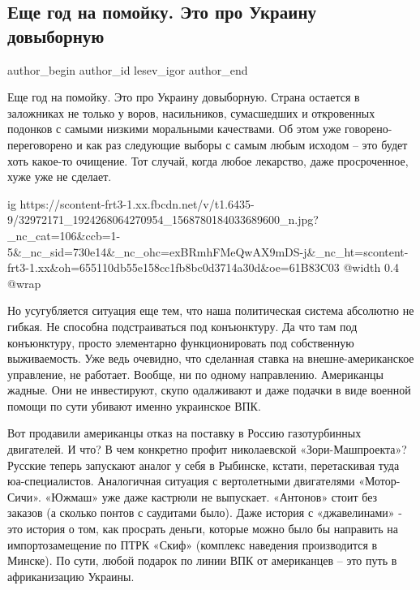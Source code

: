  
 
 
 
 
 
\subsection{Еще год на помойку. Это про Украину довыборную}
\label{sec:20_05_2018.fb.lesev_igor.1.pomojka_god_ukraina}
 
\ifcmt
 author_begin
   author_id lesev_igor
 author_end
\fi

Еще год на помойку. Это про Украину довыборную. Страна остается в заложниках не
только у воров, насильников, сумасшедших и откровенных подонков с самыми
низкими моральными качествами. Об этом уже говорено-переговорено и как раз
следующие выборы с самым любым исходом – это будет хоть какое-то очищение. Тот
случай, когда любое лекарство, даже просроченное, хуже уже не сделает.

\ifcmt
  ig https://scontent-frt3-1.xx.fbcdn.net/v/t1.6435-9/32972171_1924268064270954_1568780184033689600_n.jpg?_nc_cat=106&ccb=1-5&_nc_sid=730e14&_nc_ohc=exBRmhFMeQwAX9mDS-j&_nc_ht=scontent-frt3-1.xx&oh=655110db55e158cc1fb8bc0d3714a30d&oe=61B83C03
  @width 0.4
  @wrap 
\fi

Но усугубляется ситуация еще тем, что наша политическая система абсолютно не
гибкая. Не способна подстраиваться под конъюнктуру. Да что там под конъюнктуру,
просто элементарно функционировать под собственную выживаемость. Уже ведь
очевидно, что сделанная ставка на внешне-американское управление, не работает.
Вообще, ни по одному направлению. Американцы жадные. Они не инвестируют, скупо
одалживают и даже подачки в виде военной помощи по сути убивают именно
украинское ВПК.

Вот продавили американцы отказ на поставку в Россию газотурбинных двигателей. И
что? В чем конкретно профит николаевской «Зори-Машпроекта»? Русские теперь
запускают аналог у себя в Рыбинске, кстати, перетаскивая туда юа-специалистов.
Аналогичная ситуация с вертолетными двигателями «Мотор-Сичи». «Южмаш» уже даже
кастрюли не выпускает. «Антонов» стоит без заказов (а сколько понтов с
саудитами было). Даже история с «джавелинами» - это история о том, как просрать
деньги, которые можно было бы направить на импортозамещение по ПТРК «Скиф»
(комплекс наведения производится в Минске). По сути, любой подарок по линии ВПК
от американцев – это путь в африканизацию Украины.

